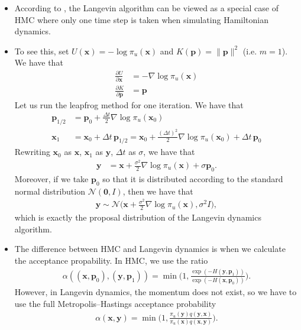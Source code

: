 \documentclass[10pt]{article}
\newcommand{\ve}[1]{\mathbf{#1}}
\newcommand{\mcal}[1]{\mathcal{#1}}
\begin{document}
\begin{itemize}
  \item According to \cite{Neal:2011}, the Langevin algorithm can be viewed as a special case of HMC where only one time step is taken when simulating Hamiltonian dynamics.
  
  \item To see this, set $U(\ve{x}) = - \log \pi_u(\ve{x})$ and $K(\ve{p}) = \|\ve{p}\|^2$ (i.e. $m = 1$). We have that
  \begin{align*}
    \frac{\partial U}{\partial \ve{x}} &= -\nabla \log \pi_u(\ve{x}) \\
    \frac{\partial K}{\partial \ve{p}} &= \ve{p}
  \end{align*}
  Let us run the leapfrog method for one iteration. We have that
  \begin{align*}
    \ve{p}_{1/2} &= \ve{p}_0 + \frac{\Delta t}{2} \nabla \log \pi_u(\ve{x}_0) \\
    \ve{x}_1 &= \ve{x}_0 + \Delta t\, \ve{p}_{1/2} = \ve{x}_0 + \frac{(\Delta t)^2}{2} \nabla \log \pi_u(\ve{x}_0) + \Delta t\, \ve{p}_0
  \end{align*}
  Rewriting $\ve{x}_0$ as $\ve{x}$, $\ve{x}_1$ as $\ve{y}$, $\Delta t$ as $\sigma$, we have that
  \begin{align} \label{eqn:hmc-one-step}
    \ve{y} &= \ve{x} + \frac{\sigma^2}{2} \nabla \log \pi_u(\ve{x}) + \sigma \ve{p}_0.
  \end{align}
  Moreover, if we take $\ve{p}_0$ so that it is distributed according to the standard normal distribution $\mcal{N}(\ve{0}, I)$, then we have that
  \begin{align*}
    \ve{y} \sim \mcal{N}\bigg( \ve{x} + \frac{\sigma^2}{2} \nabla \log \pi_u(\ve{x}), \sigma^2 I \bigg),
  \end{align*}
  which is exactly the proposal distribution of the Langevin dynamics algorithm.

  \item The difference between HMC and Langevin dynamics is when we calculate the acceptance propability. In HMC, we use the ratio 
  \begin{align*}
    \alpha((\ve{x},\ve{p}_0), (\ve{y},\ve{p}_1)) = \min\bigg(1, \frac{\exp(-H(\ve{y},\ve{p}_1))}{\exp(-H(\ve{x},\ve{p}_0))} \bigg).
  \end{align*}
  However, in Langevin dynamics, the momentum does not exist, so we have to use the full Metropolis--Hastings acceptance probability
  \begin{align*}
    \alpha(\ve{x},\ve{y}) = \min\bigg( 1, \frac{\pi_u(\ve{y}) q(\ve{y},\ve{x}) }{\pi_u(\ve{x}) q(\ve{x},\ve{y})} \bigg).
  \end{align*}
\end{itemize}
\end{document}
